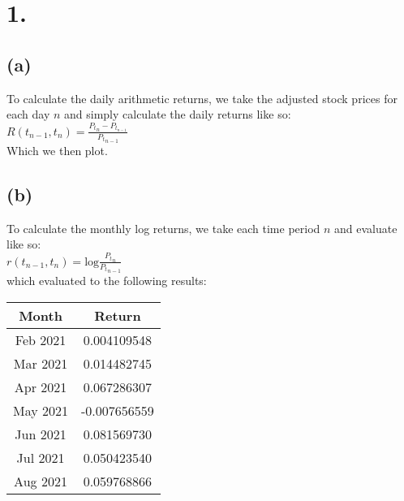 \documentclass{article}
\begin{document}
\thispagestyle{firstpageheader}

\section*{1.}
{\Large 

\subsection*{(a)}

To calculate the daily arithmetic returns, we take the adjusted stock prices for each day $n$ and simply calculate the daily returns like so: \\
$R(t_{n-1}, t_n) = \frac{{P_t}_n - P_t_{n-1}}{{P_t}_{n-1}}$ \\
Which we then plot.



\subsection*{(b)}

To calculate the monthly log returns, we take each time period $n$ and evaluate like so: \\
$r(t_{n-1}, t_n) = \text{log}\frac{{P_t}_{n}}{{P_t}_{n-1}}$ \\
which evaluated to the following results: \\

\begin{tabular}{|c|c|}
	\hline
	\textbf{Month} & \textbf{Return} \\
	\hline
	Feb 2021 & 0.004109548 \\
	\hline
	Mar 2021 & 0.014482745 \\
	\hline
	Apr 2021 & 0.067286307 \\
	\hline
	May 2021 & -0.007656559 \\
	\hline
	Jun 2021 & 0.081569730 \\
	\hline
	Jul 2021 & 0.050423540 \\
	\hline
	Aug 2021 & 0.059768866 \\
	\hline
\end{tabular}

}
\end{document}
